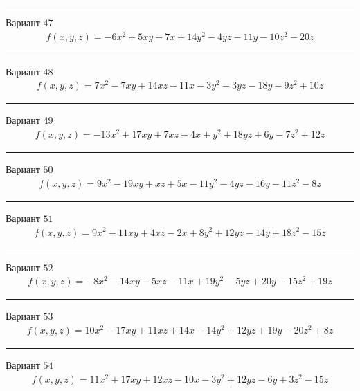\documentclass[11pt]{report}
\begin{document}
\begin{center}
\noindent\rule{8cm}{0.4pt}
\end{center}
Вариант $47$
\begin{align*}
    f(x, y, z) = - 6 x^{2} + 5 x y - 7 x + 14 y^{2} - 4 y z - 11 y - 10 z^{2} - 20 z
\end{align*}
\begin{center}
\noindent\rule{8cm}{0.4pt}
\end{center}
Вариант $48$
\begin{align*}
    f(x, y, z) = 7 x^{2} - 7 x y + 14 x z - 11 x - 3 y^{2} - 3 y z - 18 y - 9 z^{2} + 10 z
\end{align*}
\begin{center}
\noindent\rule{8cm}{0.4pt}
\end{center}
Вариант $49$
\begin{align*}
    f(x, y, z) = - 13 x^{2} + 17 x y + 7 x z - 4 x + y^{2} + 18 y z + 6 y - 7 z^{2} + 12 z
\end{align*}
\begin{center}
\noindent\rule{8cm}{0.4pt}
\end{center}
Вариант $50$
\begin{align*}
    f(x, y, z) = 9 x^{2} - 19 x y + x z + 5 x - 11 y^{2} - 4 y z - 16 y - 11 z^{2} - 8 z
\end{align*}
\begin{center}
\noindent\rule{8cm}{0.4pt}
\end{center}
Вариант $51$
\begin{align*}
    f(x, y, z) = 9 x^{2} - 11 x y + 4 x z - 2 x + 8 y^{2} + 12 y z - 14 y + 18 z^{2} - 15 z
\end{align*}
\begin{center}
\noindent\rule{8cm}{0.4pt}
\end{center}
Вариант $52$
\begin{align*}
    f(x, y, z) = - 8 x^{2} - 14 x y - 5 x z - 11 x + 19 y^{2} - 5 y z + 20 y - 15 z^{2} + 19 z
\end{align*}
\begin{center}
\noindent\rule{8cm}{0.4pt}
\end{center}
Вариант $53$
\begin{align*}
    f(x, y, z) = 10 x^{2} - 17 x y + 11 x z + 14 x - 14 y^{2} + 12 y z + 19 y - 20 z^{2} + 8 z
\end{align*}
\begin{center}
\noindent\rule{8cm}{0.4pt}
\end{center}
Вариант $54$
\begin{align*}
    f(x, y, z) = 11 x^{2} + 17 x y + 12 x z - 10 x - 3 y^{2} + 12 y z - 6 y + 3 z^{2} - 15 z
\end{align*}
\end{document}
